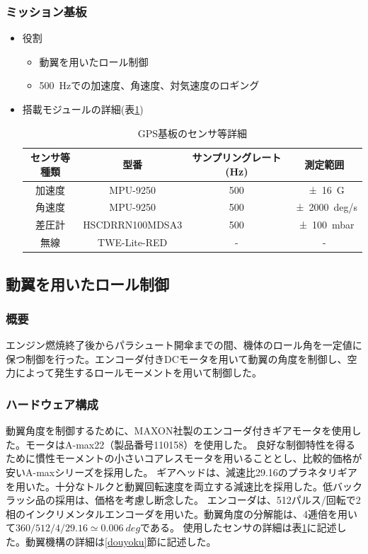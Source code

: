 \documentclass[a4paper,11pt,uplatex]{jsarticle}
\begin{document}
\subsubsection{ミッション基板}
\begin{itemize}
	\item 役割
	      \begin{itemize}
		      \item 動翼を用いたロール制御
		      \item \SI{500}{Hz}での加速度、角速度、対気速度のロギング
	      \end{itemize}

	\item 搭載モジュールの詳細(表\ref{tab:mission_detail})
	      \begin{table}[H]
		      \centering
		      \caption{GPS基板のセンサ等詳細}
		      \begin{tabular}{cccc} \toprule
			      センサ等種類 & 型番              & サンプリングレート (\si{Hz}) & 測定範囲               \\ \midrule
			      加速度    & MPU-9250        & 500                 & \SI{+-16}{G}       \\
			      角速度    & MPU-9250        & 500                 & \SI{+-2000}{deg/s} \\
			      差圧計    & HSCDRRN100MDSA3 & 500                 & \SI{+-100}{mbar}   \\
			      無線     & TWE-Lite-RED    & -                   & -                  \\
			      \bottomrule
		      \end{tabular}
		      \label{tab:mission_detail}
	      \end{table}
\end{itemize}

\subsection{動翼を用いたロール制御}
\subsubsection{概要}
エンジン燃焼終了後からパラシュート開傘までの間、機体のロール角を一定値に保つ制御を行った。エンコーダ付きDCモータを用いて動翼の角度を制御し、空力によって発生するロールモーメントを用いて制御した。
\subsubsection{ハードウェア構成}
動翼角度を制御するために、MAXON社製のエンコーダ付きギアモータを使用した。モータはA-max22（製品番号110158）を使用した。
良好な制御特性を得るために慣性モーメントの小さいコアレスモータを用いることとし、比較的価格が安いA-maxシリーズを採用した。
ギアヘッドは、減速比29.16のプラネタリギアを用いた。十分なトルクと動翼回転速度を両立する減速比を採用した。低バックラッシ品の採用は、価格を考慮し断念した。
エンコーダは、512パルス/回転で2相のインクリメンタルエンコーダを用いた。動翼角度の分解能は、4逓倍を用いて$360/512/4/29.16\simeq \SI{0.006}{deg}$である。
使用したセンサの詳細は表\ref{tab:mission_detail}に記述した。動翼機構の詳細は\ref{douyoku}節に記述した。
\end{document}
